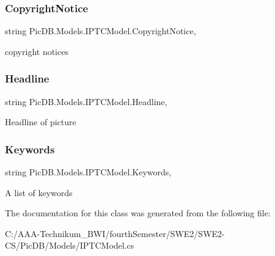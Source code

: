 \subsubsection{\texorpdfstring{Copyright\+Notice}{CopyrightNotice}}
{\footnotesize\ttfamily string Pic\+D\+B.\+Models.\+I\+P\+T\+C\+Model.\+Copyright\+Notice\hspace{0.3cm}{\ttfamily [get]}, {\ttfamily [set]}}



copyright notices 

\mbox{\label{class_pic_d_b_1_1_models_1_1_i_p_t_c_model_a5294f413c85e8d93ae28471ba66083f3}} 
\subsubsection{\texorpdfstring{Headline}{Headline}}
{\footnotesize\ttfamily string Pic\+D\+B.\+Models.\+I\+P\+T\+C\+Model.\+Headline\hspace{0.3cm}{\ttfamily [get]}, {\ttfamily [set]}}



Headline of picture 

\mbox{\label{class_pic_d_b_1_1_models_1_1_i_p_t_c_model_a60958a1ca8c9800f6499aaddd73ac5e6}} 
\subsubsection{\texorpdfstring{Keywords}{Keywords}}
{\footnotesize\ttfamily string Pic\+D\+B.\+Models.\+I\+P\+T\+C\+Model.\+Keywords\hspace{0.3cm}{\ttfamily [get]}, {\ttfamily [set]}}



A list of keywords 



The documentation for this class was generated from the following file\+:\begin{DoxyCompactItemize}
\item 
C\+:/\+A\+A\+A-\/\+Technikum\+\_\+\+B\+W\+I/fourth\+Semester/\+S\+W\+E2/\+S\+W\+E2-\/\+C\+S/\+Pic\+D\+B/\+Models/I\+P\+T\+C\+Model.\+cs\end{DoxyCompactItemize}
